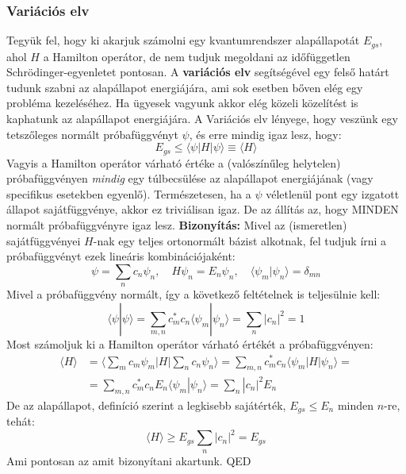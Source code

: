 \documentclass[../main.tex]{subfiles}
\begin{document}
\subsubsection{Variációs elv}
Tegyük fel, hogy ki akarjuk számolni egy kvantumrendszer alapállapotát $E_{gs}$, ahol $H$ a Hamilton operátor, de nem tudjuk megoldani az időfüggetlen Schrödinger-egyenletet pontosan.
A \textbf{variációs elv} segítségével egy felső határt tudunk szabni az alapállapot energiájára, ami sok esetben bőven elég egy probléma kezeléséhez. Ha ügyesek vagyunk akkor elég közeli közelítést is kaphatunk az alapállapot energiájára.
A Variációs elv lényege, hogy veszünk egy tetszőleges normált próbafüggvényt $\psi$, és erre mindig igaz lesz, hogy:
\begin{equation}
    \boxed{E_{gs} \leq \langle \psi | H | \psi \rangle \equiv \langle H \rangle}
\end{equation}
Vagyis a Hamilton operátor várható értéke a (valószínűleg helytelen) próbafüggvényen \textit{mindig} egy túlbecsülése az alapállapot energiájának (vagy specifikus esetekben egyenlő).
Természetesen, ha a $\psi$ véletlenül pont egy izgatott állapot sajátfüggvénye, akkor ez triviálisan igaz. De az állítás az, hogy MINDEN normált próbafüggvényre igaz lesz.
\newline
\newline
\textbf{Bizonyítás:} Mivel az (ismeretlen) sajátfüggvényei $H$-nak egy teljes ortonormált bázist alkotnak, fel tudjuk írni a próbafüggvényt ezek lineáris kombinációjaként:
\begin{equation}
    \psi = \sum_{n} c_n \psi_n, \quad H \psi_n = E_n \psi_n, \quad \langle \psi_m | \psi_n \rangle = \delta_{mn}
\end{equation}
Mivel a próbafüggvény normált, így a következő feltételnek is teljesülnie kell:
\begin{equation}
    \langle \psi | \psi \rangle = \sum_{m,n} c_m^* c_n \langle \psi_m | \psi_n \rangle = \sum_n |c_n|^2 = 1
\end{equation}
Most számoljuk ki a Hamilton operátor várható értékét a próbafüggvényen:
\begin{equation}
    \begin{aligned}
        \langle H \rangle &= \big\langle \sum_m c_m \psi_m \big| H \big| \sum_n c_n \psi_n \big\rangle = \sum_{m,n} c_m^* c_n \langle \psi_m | H | \psi_n \rangle = \\
        &= \sum_{m,n} c_m^* c_n E_n \langle \psi_m | \psi_n \rangle = \sum_n |c_n|^2 E_n
    \end{aligned}
\end{equation}
De az alapállapot, definíció szerint a legkisebb sajátérték, $E_{gs} \leq E_n$ minden $n$-re, tehát:
\begin{equation}
    \langle H \rangle \geq E_{gs} \sum_n |c_n|^2 = E_{gs}
\end{equation}
Ami pontosan az amit bizonyítani akartunk. QED
\end{document}
